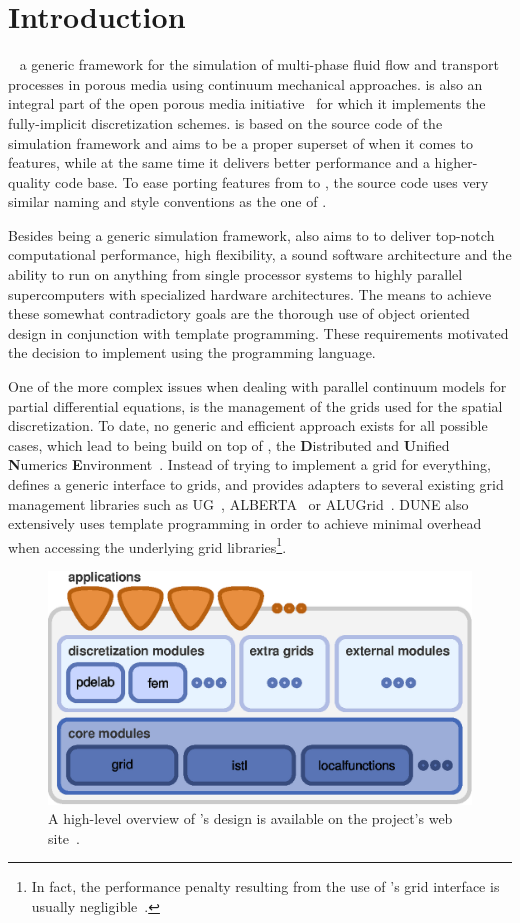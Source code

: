 \chapter{Introduction}

\eWoms~\cite{EWOMS-HP} a generic framework for the simulation of
multi-phase fluid flow and transport processes in porous media using
continuum mechanical approaches. \eWoms is also an integral part of
the open porous media initiative~\cite{OPM-HP} for which it implements
the fully-implicit discretization schemes. \eWoms is based on the
source code of the \Dumux~\cite{DUMUX-HP} simulation framework and
aims to be a proper superset of \Dumux when it comes to features,
while at the same time it delivers better performance and a
higher-quality code base. To ease porting features from \Dumux to
\eWoms, the \eWoms source code uses very similar naming and style
conventions as the one of \Dumux.

Besides being a generic simulation framework, \eWoms also aims to to
deliver top-notch computational performance, high flexibility, a sound
software architecture and the ability to run on anything from single
processor systems to highly parallel supercomputers with specialized
hardware architectures. The means to achieve these somewhat
contradictory goals are the thorough use of object oriented design in
conjunction with template programming. These requirements motivated
the decision to implement \eWoms using the \Cplusplus programming
language.

One of the more complex issues when dealing with parallel continuum
models for partial differential equations, is the management of the
grids used for the spatial discretization. To date, no generic and
efficient approach exists for all possible cases, which lead to \eWoms
being build on top of \Dune, the \textbf{D}istributed and
\textbf{U}nified \textbf{N}umerics
\textbf{E}nvironment~\cite{DUNE-HP}. Instead of trying to implement a
grid for everything, \Dune defines a generic \Cplusplus interface to
grids, and provides adapters to several existing grid management
libraries such as UG~\cite{UG-HP}, ALBERTA~\cite{ALBERTA-HP} or
ALUGrid~\cite{ALUGRID-HP}. DUNE also extensively uses template
programming in order to achieve minimal overhead when accessing the
underlying grid libraries\footnote{In fact, the performance penalty
  resulting from the use of \Dune's grid interface is usually
  negligible~\cite{BURRI2006}.}.
\begin{figure}[hbt]
  \centering 
  \includegraphics[width=.5\linewidth, keepaspectratio]{EPS/dunedesign}
  \caption{
    \label{fig:dune-design}
    A high-level overview of \Dune's design is available on the project's
    web site~\cite{DUNE-HP}.
  }
\end{figure}

